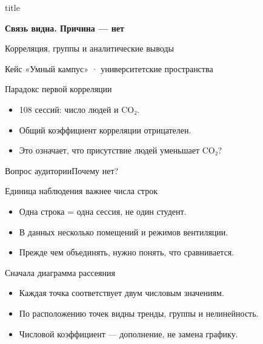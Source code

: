 \documentclass[aspectratio=169,10pt]{beamer}
\begin{document}
\begin{frame}[plain]
\begin{beamercolorbox}[wd=\paperwidth,ht=\paperheight,sep=1.4cm,center]{title}
\vspace*{1.0cm}{\large Данные как основа ИИ · семестр 2}\par\vspace{1cm}
{\fontsize{30}{38}\selectfont\bfseries Связь видна. Причина — нет}\par\vspace{0.6cm}
{\large Корреляция, группы и аналитические выводы}\par\vfill{\small Кейс «Умный кампус» · университетские пространства}
\end{beamercolorbox}\end{frame}
\begin{frame}[t]{Парадокс первой корреляции}
\vspace{.15cm}\begin{itemize}
\item 108 сессий: число людей и CO₂.\vspace{6pt}
\item Общий коэффициент корреляции отрицателен.\vspace{6pt}
\item Это означает, что присутствие людей уменьшает CO₂?\vspace{6pt}
\end{itemize}
\vfill\begin{alertblock}{Вопрос аудитории}\large Почему нет?\end{alertblock}
\end{frame}
\begin{frame}[t]{Единица наблюдения важнее числа строк}
\vspace{.15cm}\begin{itemize}
\item Одна строка = одна сессия, не один студент.\vspace{6pt}
\item В данных несколько помещений и режимов вентиляции.\vspace{6pt}
\item Прежде чем объединять, нужно понять, что сравнивается.\vspace{6pt}
\end{itemize}
\end{frame}
\begin{frame}[t]{Сначала диаграмма рассеяния}
\vspace{.15cm}\begin{itemize}
\item Каждая точка соответствует двум числовым значениям.\vspace{6pt}
\item По расположению точек видны тренды, группы и нелинейность.\vspace{6pt}
\item Числовой коэффициент — дополнение, не замена графику.\vspace{6pt}
\end{itemize}
\end{frame}
\end{document}
